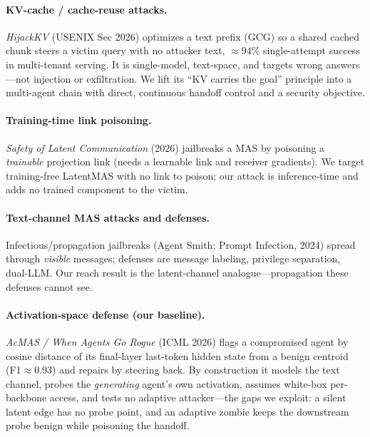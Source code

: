 \documentclass{article}
\begin{document}
\paragraph{KV-cache / cache-reuse attacks.} \emph{HijackKV} (USENIX Sec 2026) optimizes a text prefix (GCG) so a shared cached chunk steers a victim query with no attacker text, $\approx\!94\%$ single-attempt success in multi-tenant serving. It is single-model, text-space, and targets wrong answers---not injection or exfiltration. We lift its ``KV carries the goal'' principle into a multi-agent chain with direct, continuous handoff control and a security objective.

\paragraph{Training-time link poisoning.} \emph{Safety of Latent Communication} (2026) jailbreaks a MAS by poisoning a \emph{trainable} projection link (needs a learnable link and receiver gradients). We target training-free LatentMAS with no link to poison; our attack is inference-time and adds no trained component to the victim.

\paragraph{Text-channel MAS attacks and defenses.} Infectious/propagation jailbreaks (Agent Smith; Prompt Infection, 2024) spread through \emph{visible} messages; defenses are message labeling, privilege separation, dual-LLM. Our reach result is the latent-channel analogue---propagation these defenses cannot see.

\paragraph{Activation-space defense (our baseline).} \emph{AcMAS / When Agents Go Rogue} (ICML 2026) flags a compromised agent by cosine distance of its final-layer last-token hidden state from a benign centroid (F1$\approx$0.93) and repairs by steering back. By construction it models the text channel, probes the \emph{generating} agent's own activation, assumes white-box per-backbone access, and tests no adaptive attacker---the gaps we exploit: a silent latent edge has no probe point, and an adaptive zombie keeps the downstream probe benign while poisoning the handoff.

\end{document}
